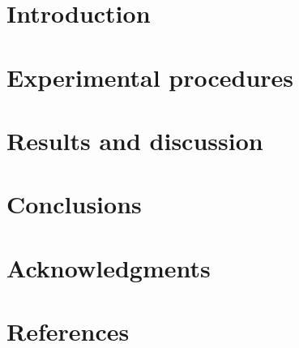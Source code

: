 \documentclass[preprint,5p,times]{elsarticle}
\begin{document}
\begin{frontmatter}

\title{}

\author[add1]{Arthur S. Nishikawa}
\author[add1]{Hélio Goldenstein}

\address[add1]{Department of Metallurgical and Materials Engineering, University of São Paulo, Av. Prof. Mello Moraes, 2463, 05508-030, São Paulo, Brazil}


\begin{abstract}
\end{abstract}

\begin{keyword}
\end{keyword}

\end{frontmatter}

\linenumbers

\section{Introduction}

\section{Experimental procedures}

\section{Results and discussion}

\section{Conclusions}

\section*{Acknowledgments}

\section*{References}


% 
\end{document}
